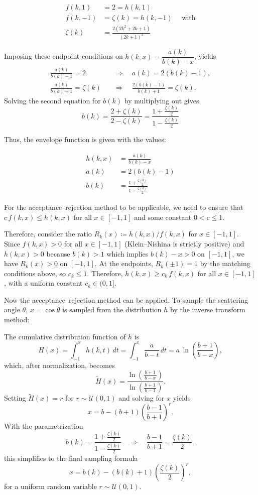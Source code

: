 \begin{align*}
    f(k,1) &= 2 = h(k,1) \\
    f(k,-1) &= \zeta(k) = h(k,-1)  \quad \text{ with}\\
     \zeta(k) &= \frac{2(2k^2 + 2k + 1)}{(2k + 1)^3}
\end{align*}

Imposing these endpoint conditions on $h(k,x)=\dfrac{a(k)}{b(k)-x}$, yields
\begin{align*}
\frac{a(k)}{b(k)-1}=2 \quad&\Rightarrow\quad a(k)=2(b(k)-1),\\
\frac{a(k)}{b(k)+1}=\zeta(k) \quad&\Rightarrow\quad \frac{2(b(k)-1)}{b(k)+1}=\zeta(k).
\end{align*}
Solving the second equation for $b(k)$ by multiplying out gives
$$
b(k)=\frac{2+\zeta(k)}{2-\zeta(k)}=\frac{1+\frac{\zeta(k)}{2}}{1-\frac{\zeta(k)}{2}} $$

Thus, the envelope function is given with the values:



\begin{align*}
    h(k,x) &= \frac{a(k)}{b(k)-x} \\
    a(k) &= 2(b(k)-1) \\
    b(k) &= \frac{1+\frac{\zeta(k)}{2}}{1-\frac{\zeta(k)}{2}}
\end{align*}

For the acceptance--rejection method to be applicable, we need to ensure that $c\,f(k,x) \leq h(k,x)$ for all $x \in [-1,1]$ and some constant $0 < c \leq 1$. 

Therefore, consider the ratio $R_k(x)\coloneqq h(k,x)/f(k,x)$ for $x\in[-1,1]$.
Since $f(k,x)>0$ for all $x\in[-1,1]$ (Klein--Nishina is strictly positive) and
$h(k,x)>0$ because $b(k)>1$ which implies $b(k)-x>0$ on $[-1,1]$, we have $R_k(x)>0$
on $[-1,1]$. At the endpoints, $R_k(\pm 1)=1$ by the matching conditions above,
so $c_k\le 1$. Therefore, $h(k,x)\ge c_k\,f(k,x)$ for all $x\in[-1,1]$, with a
uniform constant $c_k \in(0,1]$.

Now the acceptance--rejection method can be applied. To sample the scattering
angle $\theta$, $x=\cos\theta$ is sampled from the distribution $h$ by the
inverse transform method:

The cumulative distribution function of $h$ is
$$
H(x) = \int_{-1}^{x}h(k,t)\,dt=\int_{-1}^x \frac{a}{b-t}\,dt
= a\,\ln\!\left(\frac{b+1}{b-x}\right),
$$
which, after normalization, becomes
$$
\tilde H(x)
= \frac{\ln\!\left(\tfrac{b+1}{\,b-x\,}\right)}
       {\ln\!\left(\tfrac{b+1}{\,b-1\,}\right)}.
$$
Setting $\tilde H(x)=r$ for $r\sim\mathcal U(0,1)$ and solving for $x$ yields
$$
x = b - (b+1)\left(\frac{b-1}{b+1}\right)^{r}.
$$
With the parametrization
$$
b(k) = \frac{1+\frac{\zeta(k)}{2}}{1-\frac{\zeta(k)}{2}}
\quad\Longrightarrow\quad
\frac{b-1}{b+1} = \frac{\zeta(k)}{2},
$$
this simplifies to the final sampling formula
$$
x = b(k) - (b(k)+1)\left(\frac{\zeta(k)}{2}\right)^{r},
$$
for a uniform random variable $r \sim \mathcal{U}(0,1)$. 

